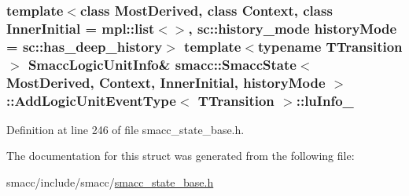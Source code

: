 \subsubsection[{\texorpdfstring{lu\+Info\+\_\+}{luInfo_}}]{\setlength{\rightskip}{0pt plus 5cm}template$<$class Most\+Derived, class Context, class Inner\+Initial = mpl\+::list$<$$>$, sc\+::history\+\_\+mode history\+Mode = sc\+::has\+\_\+deep\+\_\+history$>$ template$<$typename T\+Transition $>$ {\bf Smacc\+Logic\+Unit\+Info}\& {\bf smacc\+::\+Smacc\+State}$<$ Most\+Derived, Context, Inner\+Initial, history\+Mode $>$\+::{\bf Add\+Logic\+Unit\+Event\+Type}$<$ T\+Transition $>$\+::lu\+Info\+\_\+}\hypertarget{structsmacc_1_1SmaccState_1_1AddLogicUnitEventType_a31c27ea945cd0127080c0bae872c028e}{}\label{structsmacc_1_1SmaccState_1_1AddLogicUnitEventType_a31c27ea945cd0127080c0bae872c028e}


Definition at line 246 of file smacc\+\_\+state\+\_\+base.\+h.



The documentation for this struct was generated from the following file\+:\begin{DoxyCompactItemize}
\item 
smacc/include/smacc/\hyperlink{smacc__state__base_8h}{smacc\+\_\+state\+\_\+base.\+h}\end{DoxyCompactItemize}
